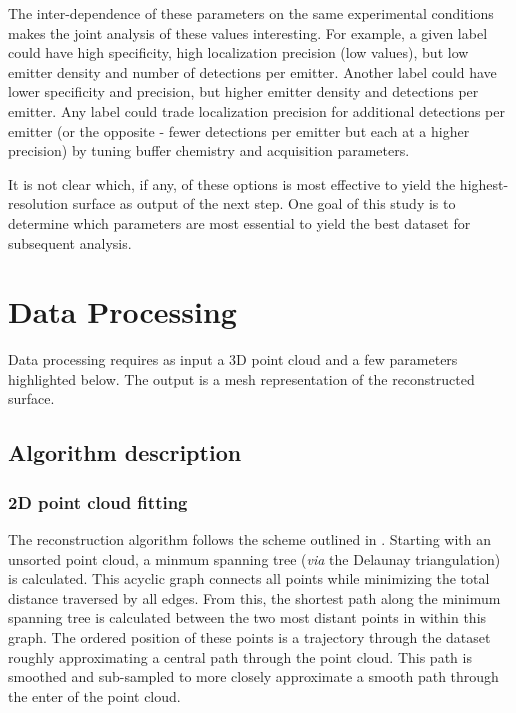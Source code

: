 \documentclass[10pt,a4paper]{article}
\begin{document}
The inter-dependence of these parameters on the same experimental conditions makes the joint analysis of these values interesting.  For example, a given label could have high specificity, high localization precision (low values), but low emitter density and number of detections per emitter.  Another label could have lower specificity and precision, but higher emitter density and detections per emitter.  Any label could trade localization precision for additional detections per emitter (or the opposite - fewer detections per emitter but each at a higher precision) by tuning buffer chemistry and acquisition parameters.  

It is not clear which, if any, of these options is most effective to yield the highest-resolution surface as output of the next step.  One goal of this study is to determine which parameters are most essential to yield the best dataset for subsequent analysis.  

\section{Data Processing}

Data processing requires as input a 3D point cloud and a few parameters highlighted below.  The output is a mesh representation of the reconstructed surface. 

\subsection{Algorithm description}

\subsubsection{2D point cloud fitting}

The reconstruction algorithm follows the scheme outlined in \cite{lee2000curve}. Starting with an unsorted point cloud, a minmum spanning tree (\textit{via} the Delaunay triangulation) is calculated.  This acyclic graph connects all points while minimizing the total distance traversed by all edges.  From this, the shortest path along the minimum spanning tree is calculated between the two most distant points in within this graph. The ordered position of these points is a trajectory through the dataset roughly approximating a central path through the point cloud.  This path is smoothed and sub-sampled to more closely approximate a smooth path through the enter of the point cloud.  
\end{document}
